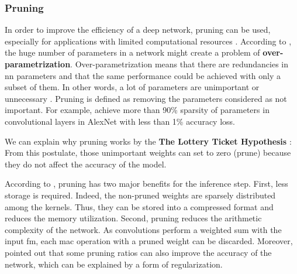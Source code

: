 \subsubsection{Pruning} \label{subs:pruning}
In order to improve the efficiency of a deep network, pruning can be used, especially for applications with limited computational resources \cite{liu_rethinking_2019}. According to \textcite{denton_exploiting_2014, liu_rethinking_2019}, the huge number of parameters in a network might create a problem of \textbf{over-parametrization}. Over-parametrization means that there are redundancies in \acrshort{nn} parameters and that the same performance could be achieved with only a subset of them. In other words, a lot of parameters are unimportant or unnecessary \cite{cheng_recent_2018}. Pruning is defined as removing the parameters considered as not important. For example, \textcite{baoyuan_liu_sparse_2015} achieve more than 90\% sparsity of parameters in convolutional layers in AlexNet with less than 1\% accuracy loss.

We can explain why pruning works by the \textbf{The Lottery Ticket Hypothesis} \cite{frankle_lottery_2019, frankle_early_2020}:  From this postulate, those unimportant weights can set to zero (prune) because they do not affect the accuracy of the model.

According to \textcite{cheng_recent_2018}, pruning has two major benefits for the inference step. First, less storage is required. Indeed, the non-pruned weights are sparsely distributed among the kernels. Thus, they can be stored into a compressed format and reduces the memory utilization. Second, pruning reduces the arithmetic complexity of the network. As convolutions perform a weighted sum with the input \acrshort{fm}, each \acrfull{mac} operation with a pruned weight can be discarded. Moreover, \textcite{han_learning_2015, mao_exploring_2017, kang_accelerator-aware_2020} pointed out that some pruning ratios can also improve the accuracy of the network, which can be explained by a form of regularization.

